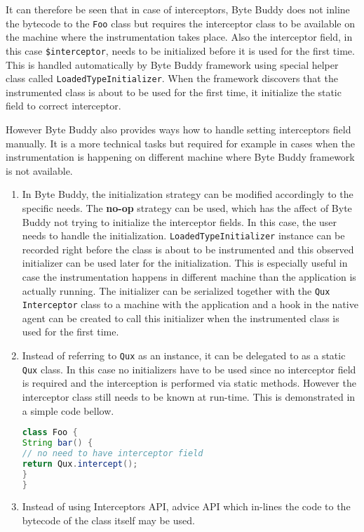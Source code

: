 It can therefore be seen that in case of interceptors, Byte Buddy does not inline the bytecode to the \texttt{Foo} class but requires the interceptor class to be available on the machine where the instrumentation takes place. Also the interceptor field, in this case \texttt{\$interceptor}, needs to be initialized before it is used for the first time. This is handled automatically by Byte Buddy framework using special helper class called \texttt{LoadedTypeInitializer}. When the framework discovers that the instrumented class is about to be used for the first time, it initialize the static field to correct interceptor.

However Byte Buddy also provides ways how to handle setting interceptors field manually. It is a more technical tasks but required for example in cases when the instrumentation is happening on different machine where Byte Buddy framework is not available.
\begin{enumerate}
\item In Byte Buddy, the initialization strategy can be modified accordingly to the specific needs. The \textbf{no-op} strategy can be used, which has the affect of Byte Buddy not trying to initialize the interceptor fields. In this case, the user needs to handle the initialization. \texttt{LoadedTypeInitializer} instance can be recorded right before the class is about to be instrumented and this observed initializer can be used later for the initialization. This is especially useful in case the instrumentation happens in different machine than the application is actually running. The initializer can be serialized together with the \texttt{Qux} \texttt{Interceptor} class to a machine with the application and a hook in the native agent can be created to call this initializer when the instrumented class is used for the first time.

\item Instead of referring to \texttt{Qux} as an instance, it can be delegated to as a static \texttt{Qux} class. In this case no initializers have to be used since no interceptor field is required and the interception is performed via static methods. However the interceptor class still needs to be known at run-time. This is demonstrated in a simple code bellow.

\begin{lstlisting}[language=Java]
class Foo {
String bar() {
// no need to have interceptor field
return Qux.intercept(); 
}
}
\end{lstlisting}

\item Instead of using Interceptors API, advice API which in-lines the code to the bytecode of the class itself may be used.
\end{enumerate}


